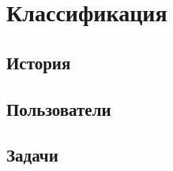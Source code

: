 \section{Классификация}\label{base:os:classification}
\subsection{История}\label{base:os:classification:history}
\subsection{Пользователи}\label{base:os:classification:users}
\subsection{Задачи}\label{base:os:classification:tasks}